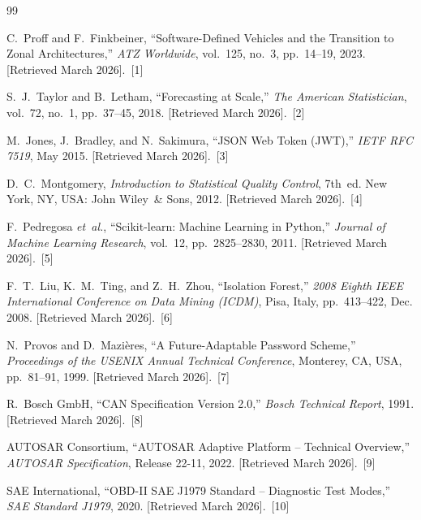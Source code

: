 \documentclass[12pt,a4paper,oneside]{report}
\begin{document}
\begin{thebibliography}{99}


C.~Proff and F.~Finkbeiner,
``Software-Defined Vehicles and the Transition to Zonal Architectures,''
\textit{ATZ Worldwide}, vol.~125, no.~3, pp.~14--19, 2023.
[Retrieved March 2026].~[1]

S.~J.~Taylor and B.~Letham,
``Forecasting at Scale,''
\textit{The American Statistician},
vol.~72, no.~1, pp.~37--45, 2018.
[Retrieved March 2026].~[2]

M.~Jones, J.~Bradley, and N.~Sakimura,
``JSON Web Token (JWT),''
\textit{IETF RFC 7519}, May 2015.
[Retrieved March 2026].~[3]

D.~C.~Montgomery,
\textit{Introduction to Statistical Quality Control}, 7th~ed.
New York, NY, USA: John Wiley~\& Sons, 2012.
[Retrieved March 2026].~[4]

F.~Pedregosa \textit{et~al.},
``Scikit-learn: Machine Learning in Python,''
\textit{Journal of Machine Learning Research},
vol.~12, pp.~2825--2830, 2011.
[Retrieved March 2026].~[5]

F.~T.~Liu, K.~M.~Ting, and Z.~H.~Zhou,
``Isolation Forest,''
\textit{2008 Eighth IEEE International Conference on Data Mining (ICDM)},
Pisa, Italy, pp.~413--422, Dec. 2008.
[Retrieved March 2026].~[6]

N.~Provos and D.~Mazi\`eres,
``A Future-Adaptable Password Scheme,''
\textit{Proceedings of the USENIX Annual Technical Conference},
Monterey, CA, USA, pp.~81--91, 1999.
[Retrieved March 2026].~[7]

R.~Bosch GmbH,
``CAN Specification Version 2.0,''
\textit{Bosch Technical Report}, 1991.
[Retrieved March 2026].~[8]


AUTOSAR Consortium,
``AUTOSAR Adaptive Platform -- Technical Overview,''
\textit{AUTOSAR Specification}, Release 22-11, 2022.
[Retrieved March 2026].~[9]

SAE International,
``OBD-II SAE J1979 Standard -- Diagnostic Test Modes,''
\textit{SAE Standard J1979}, 2020.
[Retrieved March 2026].~[10]



\end{thebibliography}
\end{document}
